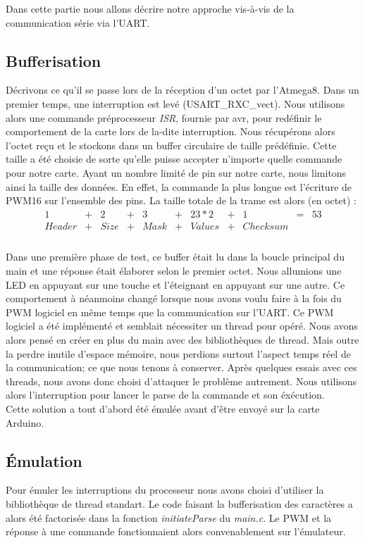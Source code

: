 Dans cette partie nous allons décrire notre approche vis-à-vis de la 
communication série via l'UART. 

\subsection{Bufferisation}
Décrivons ce qu'il se passe lors de la réception d'un octet par l'Atmega8. 
Dans un premier temps, une interruption est levé (USART\_RXC\_vect). Nous 
utilisons alors une commande préprocesseur \textit{ISR}, fournie par avr, 
pour redéfinir le comportement de la carte lors de la-dite interruption.
Nous récupérons alors l'octet reçu et le stockons dans un buffer circulaire
de taille prédéfinie. Cette taille a été choisie de sorte qu'elle puisse 
accepter n'importe quelle commande pour notre carte. Ayant un nombre limité
de pin sur notre carte, nous limitons ainsi la taille des données. En 
effet, la commande la plus longue est l'écriture de PWM16 sur l'ensemble
des pins. La taille totale de la trame est alors (en octet) : \\
$$
\begin{array}{ccccccccccc}
1     &+&   2&+&   3&+&  23*2&+&       1&=&53\\
Header&+&Size&+&Mask&+&Values&+&Checksum& &\\
\end{array}
$$
~\\

Dans une première phase de test, ce buffer était lu dans la boucle principal
du main et une réponse était élaborer selon le premier octet. Nous allumions une
LED en appuyant sur une touche et l'éteignant en appuyant sur une autre.
Ce comportement à néanmoins changé lorsque nous avons voulu faire à la fois
du PWM logiciel en même temps que la communication sur l'UART.
Ce PWM logiciel a été implémenté et semblait nécessiter un thread pour opéré.
Nous avons alors pensé en créer en plus du main avec des bibliothèques de thread.
Mais outre la perdre inutile d'espace mémoire, nous perdions surtout
l'aspect temps réel de la communication; ce que nous tenons à conserver.
Après quelques essais avec ces threads, nous avons donc choisi d'attaquer le
problème autrement. Nous utilisons alors l'interruption pour lancer le parse
de la commande et son éxécution.\\

Cette solution a tout d'abord été émulée avant d'être envoyé sur la carte 
Arduino.

\subsection{Émulation}
Pour émuler les interruptions du processeur nous avons choisi d'utiliser 
la bibliothèque de thread standart. Le code faisant la bufferisation
des caractères a alors été factorisée dans la fonction
\textit{initiateParse} du \textit{main.c}. Le PWM et la réponse à une commande
fonctionnaient alors convenablement sur l'émulateur.\\

